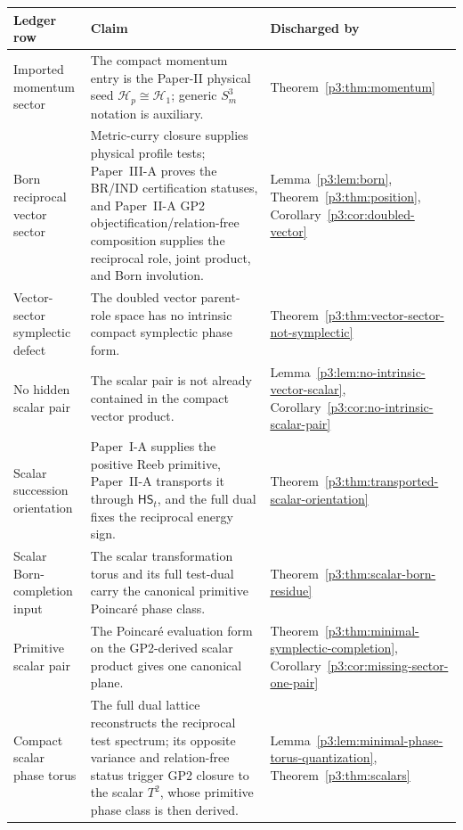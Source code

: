 \documentclass[12pt,a4paper]{article}
\begin{document}
\begin{table}[H]
\centering
\small
\begingroup
\setlength{\tabcolsep}{3pt}
\renewcommand{\arraystretch}{1.15}
\begin{tabular}{@{}
  L{3.5cm}
  L{8.0cm}
  L{\dimexpr\linewidth-11.5cm-4\tabcolsep\relax}
@{}}
\toprule
\textbf{Ledger row}
& \textbf{Claim}
& \textbf{Discharged by} \\
\midrule
Imported momentum sector
& The compact momentum entry is the Paper-II physical seed \(\mathcal H_p\cong\mathcal H_1\); generic \(S^3_m\) notation is auxiliary.
& Theorem~\ref{p3:thm:momentum} \\

Born reciprocal vector sector
& Metric-curry closure supplies physical profile tests; Paper~III-A proves the
BR/IND certification statuses, and Paper~II-A GP2 objectification/relation-free
composition supplies the reciprocal role, joint product, and Born involution.
& Lemma~\ref{p3:lem:born}, Theorem~\ref{p3:thm:position}, Corollary~\ref{p3:cor:doubled-vector} \\

Vector-sector symplectic defect
& The doubled vector parent-role space has no intrinsic compact symplectic phase form.
& Theorem~\ref{p3:thm:vector-sector-not-symplectic} \\

No hidden scalar pair
& The scalar pair is not already contained in the compact vector product.
& Lemma~\ref{p3:lem:no-intrinsic-vector-scalar}, Corollary~\ref{p3:cor:no-intrinsic-scalar-pair} \\

Scalar succession orientation
& Paper~I-A supplies the positive Reeb primitive, Paper~II-A transports it
through \(\mathsf{HS}_t\), and the full dual fixes the reciprocal energy sign.
& Theorem~\ref{p3:thm:transported-scalar-orientation} \\

Scalar Born-completion input
& The scalar transformation torus and its full test-dual carry the canonical primitive Poincar\'e phase class.
& Theorem~\ref{p3:thm:scalar-born-residue} \\

Primitive scalar pair
& The Poincar\'e evaluation form on the GP2-derived scalar product gives one canonical plane.
& Theorem~\ref{p3:thm:minimal-symplectic-completion}, Corollary~\ref{p3:cor:missing-sector-one-pair} \\

Compact scalar phase torus
& The full dual lattice reconstructs the reciprocal test spectrum; its
opposite variance and relation-free status trigger GP2 closure to the scalar
\(T^2\), whose primitive phase class is then derived.
& Lemma~\ref{p3:lem:minimal-phase-torus-quantization}, Theorem~\ref{p3:thm:scalars} \\


\end{tabular}
\end{table}
\end{document}
